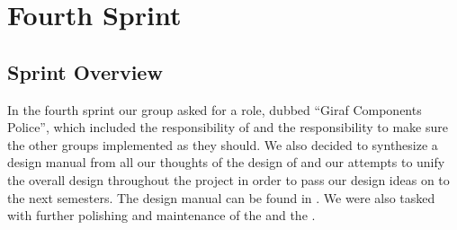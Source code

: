 \part{Fourth Sprint}
\label{par:fourth_sprint}

\chapter{Sprint Overview}
In the fourth sprint our group asked for a role, dubbed ``Giraf Components Police'', which included the responsibility of \gc and the responsibility to make sure the other groups implemented \gc as they should. We also decided to synthesize a design manual from all our thoughts of the design of \giraf and our attempts to unify the overall design throughout the project in order to pass our design ideas on to the next semesters. The design manual can be found in . We were also tasked with further polishing and maintenance of the \ct and the \launcher. 









